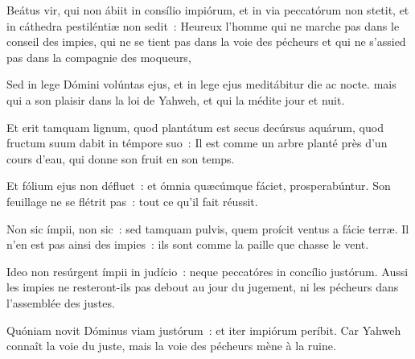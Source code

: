 
\begin{paracol}{2}

\LigneParacol{0cm}
{Beátus vir, qui non ábiit in consílio impiórum, et in via peccatórum non stetit, \GreStar{} et in cáthedra pestiléntiæ non sedit~:}
{Heureux l'homme qui ne marche pas dans le conseil des impies, qui ne se tient pas dans la voie des pécheurs et qui ne s'assied pas dans la compagnie des moqueurs, }

\LigneParacol{0.2cm}
{Sed in lege Dómini volúntas ejus, \GreStar{} et in lege ejus meditábitur die ac nocte.}
{mais qui a son plaisir dans la loi de Yahweh, et qui la médite jour et nuit. }

\LigneParacol{0.2cm}
{Et erit tamquam lignum, quod plantátum est secus decúrsus aquárum, \GreStar{} quod fructum suum dabit in témpore suo~:}
{Il est comme un arbre planté près d'un cours d'eau, qui donne son fruit en son temps.}

\LigneParacol{0.2cm}
{Et fólium ejus non défluet~: \GreStar{} et ómnia quæcúmque fáciet, prosperabúntur.}
{Son feuillage ne se flétrit pas~: tout ce qu'il fait réussit. }

\LigneParacol{0.2cm}
{Non sic ímpii, non sic~: \GreStar{} sed tamquam pulvis, quem proícit ventus a fácie terræ.}
{Il n'en est pas ainsi des impies~: ils sont comme la paille que chasse le vent. }

\LigneParacol{0.2cm}
{Ideo non resúrgent ímpii in judício~: \GreStar{} neque peccatóres in concílio justórum.}
{Aussi les impies ne resteront-ils pas debout au jour du jugement, ni les pécheurs dans l'assemblée des justes. }

\LigneParacol{0.2cm}
{Quóniam novit Dóminus viam justórum~: \GreStar{} et iter impiórum períbit.}
{Car Yahweh connaît la voie du juste, mais la voie des pécheurs mène à la ruine. }

\end{paracol}
\Gloria
{}

